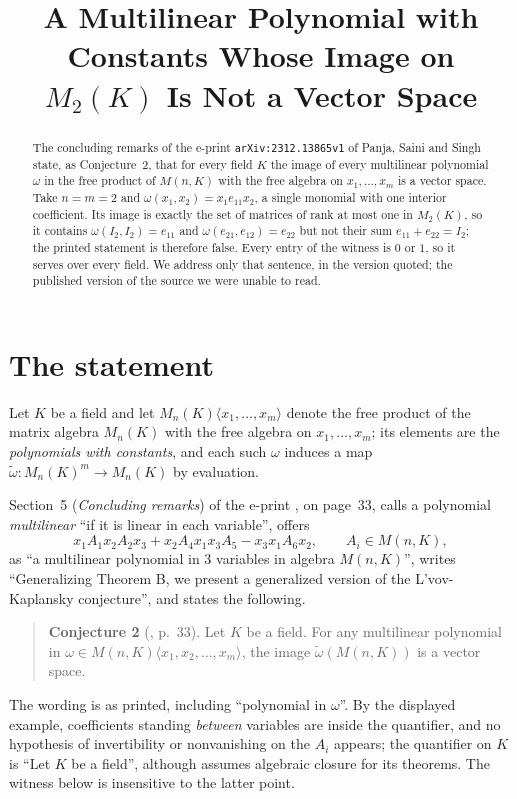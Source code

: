 \documentclass[11pt]{amsart}
\title[An image that is not a vector space]
{A Multilinear Polynomial with Constants Whose Image on $M_2(K)$
 Is Not a Vector Space}
\date{}
\theoremstyle{remark}
\newcommand{\Mn}{M_n(K)}
\newcommand{\im}{\widetilde\omega}
\begin{document}
\begin{abstract}
The concluding remarks of the e-print \texttt{arXiv:2312.13865v1} of Panja,
Saini and Singh state, as Conjecture~2, that for every field $K$ the image of
every multilinear polynomial $\omega$ in the free product of $M(n,K)$ with the
free algebra on $x_1,\dots,x_m$ is a vector space. Take $n=m=2$ and
$\omega(x_1,x_2)=x_1e_{11}x_2$, a single monomial with one interior
coefficient. Its image is exactly the set of matrices of rank at most one in
$M_2(K)$, so it contains $\omega(I_2,I_2)=e_{11}$ and
$\omega(e_{21},e_{12})=e_{22}$ but not their sum $e_{11}+e_{22}=I_2$; the
printed statement is therefore false. Every entry of the witness is $0$ or
$1$, so it serves over every field. We address only that sentence, in the
version quoted; the published version of the source we were unable to read.
\end{abstract}

\maketitle

\section{The statement}

Let $K$ be a field and let $\Mn\langle x_1,\dots,x_m\rangle$ denote the free
product of the matrix algebra $\Mn$ with the free algebra on
$x_1,\dots,x_m$; its elements are the \emph{polynomials with constants}, and
each such $\omega$ induces a map $\im\colon\Mn^m\to\Mn$ by evaluation.

Section~5 (\emph{Concluding remarks}) of the e-print \cite{PSS}, on page~33,
calls a polynomial \emph{multilinear} ``if it is linear in each variable'',
offers
\[
  x_1A_1x_2A_2x_3+x_2A_4x_1x_3A_5-x_3x_1A_6x_2,
  \qquad A_i\in M(n,K),
\]
as ``a multilinear polynomial in 3 variables in algebra $M(n,K)$'', writes
``Generalizing Theorem B, we present a generalized version of the
L'vov-Kaplansky conjecture'', and states the following.

\begin{quote}
\textbf{Conjecture 2} (\cite{PSS}, p.~33). Let $K$ be a field. For any
multilinear polynomial in $\omega\in M(n,K)\langle x_1,x_2,\dots,x_m\rangle$,
the image $\im(M(n,K))$ is a vector space.
\end{quote}

\noindent
The wording is as printed, including ``polynomial in $\omega$''. By the
displayed example, coefficients standing \emph{between} variables are inside
the quantifier, and no hypothesis of invertibility or nonvanishing on the
$A_i$ appears; the quantifier on $K$ is ``Let $K$ be a field'', although
\cite{PSS} assumes algebraic closure for its theorems. The witness below is
insensitive to the latter point.
\end{document}
